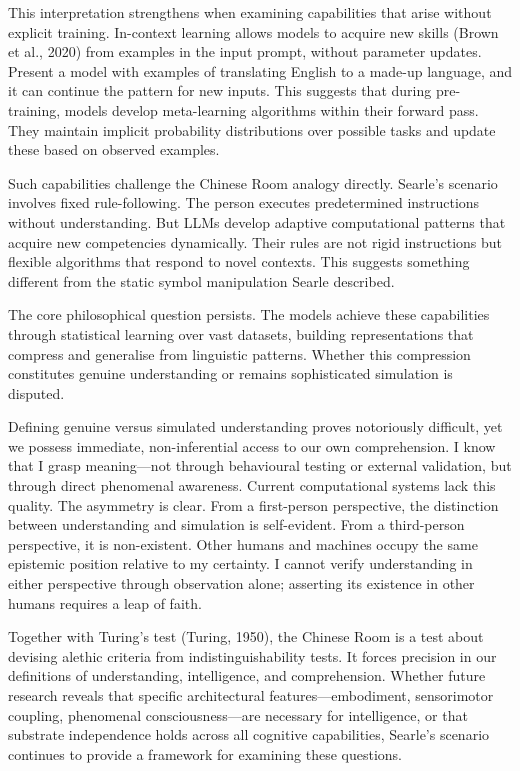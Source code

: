 This interpretation strengthens when examining capabilities that arise without explicit training. In-context learning allows models to acquire new skills (Brown et al., 2020) from examples in the input prompt, without parameter updates. Present a model with examples of translating English to a made-up language, and it can continue the pattern for new inputs. This suggests that during pre-training, models develop meta-learning algorithms within their forward pass. They maintain implicit probability distributions over possible tasks and update these based on observed examples.

Such capabilities challenge the Chinese Room analogy directly. Searle's scenario involves fixed rule-following. The person executes predetermined instructions without understanding. But LLMs develop adaptive computational patterns that acquire new competencies dynamically. Their \QSOpen{}rules\QSClose{} are not rigid instructions but flexible algorithms that respond to novel contexts. This suggests something different from the static symbol manipulation Searle described.

The core philosophical question persists. The models achieve these capabilities through statistical learning over vast datasets, building representations that compress and generalise from linguistic patterns. Whether this compression constitutes genuine understanding or remains sophisticated simulation is disputed.

Defining \QSOpen{}genuine\QSClose{} versus \QSOpen{}simulated\QSClose{} understanding proves notoriously difficult, yet we possess immediate, non-inferential access to our own comprehension. I know that I grasp meaning—not through behavioural testing or external validation, but through direct phenomenal awareness. Current computational systems lack this quality. The asymmetry is clear. From a first-person perspective, the distinction between understanding and simulation is self-evident. From a third-person perspective, it is non-existent. Other humans and machines occupy the same epistemic position relative to my certainty. I cannot verify understanding in either perspective through observation alone; asserting its existence in other humans requires a leap of faith.

Together with Turing's test (Turing, 1950), the Chinese Room is a test about devising alethic criteria from indistinguishability tests. It forces precision in our definitions of understanding, intelligence, and comprehension. Whether future research reveals that specific architectural features—embodiment, sensorimotor coupling, phenomenal consciousness—are necessary for intelligence, or that substrate independence holds across all cognitive capabilities, Searle's scenario continues to provide a framework for examining these questions.


